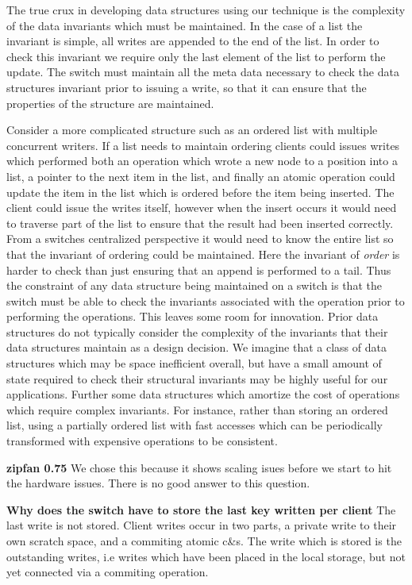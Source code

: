 The true crux in developing data structures using our technique is the
complexity of the data invariants which must be maintained. In the case of a
list the invariant is simple, all writes are appended to the end of the list.
In order to check this invariant we require only the last element of the list
to perform the update. The switch must maintain all the meta data necessary
to check the data structures invariant prior to issuing a write, so that it
can ensure that the properties of the structure are maintained.

Consider a more complicated structure such as an ordered list with multiple
concurrent writers. If a list needs to maintain ordering clients could issues
writes which performed both an operation which wrote a new node to a position
into a list, a pointer to the next item in the list, and finally an atomic
operation could update the item in the list which is ordered before the item
being inserted. The client could issue the writes itself, however when the
insert occurs it would need to traverse part of the list to ensure that the
result had been inserted correctly. From a switches centralized perspective
it would need to know the entire list so that the invariant of ordering could
be maintained. Here the invariant of \textit{order} is harder to check than
just ensuring that an append is performed to a tail. Thus the constraint of
any data structure being maintained on a switch is that the switch must be
able to check the invariants associated with the operation prior to
performing the operations. This leaves some room for innovation. Prior data
structures do not typically consider the complexity of the invariants that
their data structures maintain as a design decision. We imagine that a class
of data structures which may be space inefficient overall, but have a small
amount of state required to check their structural invariants may be highly
useful for our applications. Further some data structures which amortize the
cost of operations which require complex invariants. For instance, rather
than storing an ordered list, using a partially ordered list with fast
accesses which can be periodically transformed with expensive operations to
be consistent.

\textbf{zipfan 0.75} 
We chose this because it shows scaling isues before we
start to hit the hardware issues. There is no good answer to this question.

\textbf{Why does the switch have to store the last key written per client}
The last write is not stored. Client writes occur in two parts, a private
write to their own scratch space, and a commiting atomic c\&s. The write
which is stored is the outstanding writes, i.e writes which have been placed
in the local storage, but not yet connected via a commiting operation.










